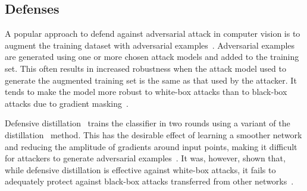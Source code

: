  

\subsection{Defenses}
A popular approach to defend against adversarial attack in computer vision is to augment the training dataset with adversarial examples~\cite{szegedy2014going, Goodfellow2015ADVexample, moosavidezfooli2016deepfool}. Adversarial examples are generated using one or more chosen attack models and added to the training
set. This often results in increased robustness when the attack model used to generate the augmented
training set is the same as that used by the attacker. It tends to make the model more robust to white-box attacks than to black-box attacks due to gradient masking~\cite{Papernot2016TowardsTS, tramer2020ensemble}.

Defensive distillation~\cite{papernot2016distillation} trains the classifier in two rounds using a variant of the
distillation~\cite{hinton2015distilling} method. This has the desirable effect of learning a smoother network
and reducing the amplitude of gradients around input points, making it difficult for attackers to
generate adversarial examples~\cite{papernot2016distillation}. It was, however, shown that, while defensive
distillation is effective against white-box attacks, it fails to adequately protect against black-box
attacks transferred from other networks~\cite{Carlini2017}.

